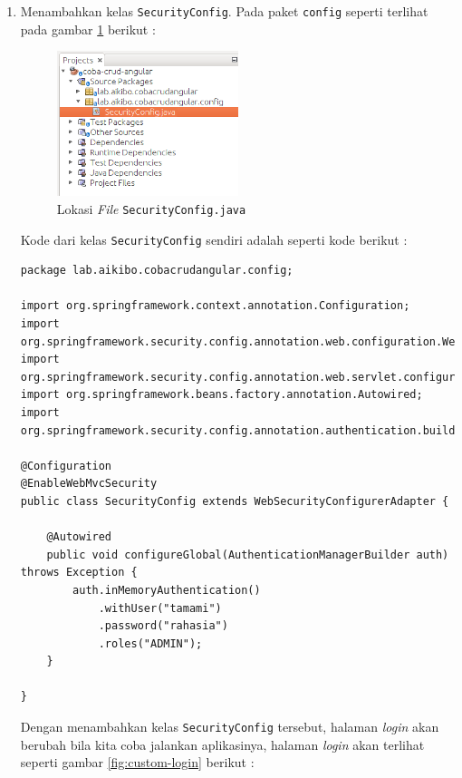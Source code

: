 \begin{enumerate}
	\item Menambahkan kelas \texttt{SecurityConfig}. Pada paket \texttt{config} seperti terlihat pada gambar \ref{fig:lokasi-security-config} berikut :
	
	\begin{figure}[H]
		\centering
		\includegraphics[width=0.5\textwidth]{./resources/021-lokasi-security-config}
		\caption{Lokasi \textit{File} \texttt{SecurityConfig.java}}
		\label{fig:lokasi-security-config}
	\end{figure}
		
	Kode dari kelas \texttt{SecurityConfig} sendiri adalah seperti kode berikut :
	
	\begin{lstlisting}
package lab.aikibo.cobacrudangular.config;

import org.springframework.context.annotation.Configuration;
import org.springframework.security.config.annotation.web.configuration.WebSecurityConfigurerAdapter;
import org.springframework.security.config.annotation.web.servlet.configuration.EnableWebMvcSecurity;
import org.springframework.beans.factory.annotation.Autowired; 
import org.springframework.security.config.annotation.authentication.builders.AuthenticationManagerBuilder;

@Configuration
@EnableWebMvcSecurity
public class SecurityConfig extends WebSecurityConfigurerAdapter {
	
	@Autowired
	public void configureGlobal(AuthenticationManagerBuilder auth) throws Exception {
		auth.inMemoryAuthentication()
			.withUser("tamami")
			.password("rahasia")
			.roles("ADMIN");
	}

}
	\end{lstlisting}
	
	Dengan menambahkan kelas \texttt{SecurityConfig} tersebut, halaman \textit{login} akan berubah bila kita coba jalankan aplikasinya, halaman \textit{login} akan terlihat seperti gambar \ref{fig:custom-login} berikut :
	

\end{enumerate}
